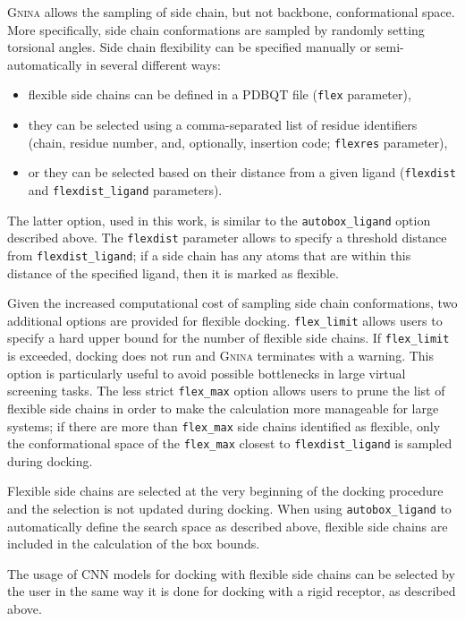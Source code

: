 \documentclass[journal=jcisd8,manuscript=article]{achemso}
\begin{document}
\textsc{Gnina} allows the sampling of side chain, but not backbone, conformational space. More specifically, side chain conformations are sampled by randomly setting torsional angles. Side chain flexibility can be specified manually or semi-automatically in several different ways: 
\begin{itemize}
    \item flexible side chains can be defined in a PDBQT file (\texttt{flex} parameter),
    \item they can be selected using a comma-separated list of residue identifiers (chain, residue number, and, optionally, insertion code; \texttt{flexres} parameter),
    \item or they can be selected based on their distance from a given ligand (\texttt{flexdist} and \texttt{flexdist\_ligand} parameters).
\end{itemize}
The latter option, used in this work, is similar to the \texttt{autobox\_ligand} option described above. The \texttt{flexdist} parameter allows to specify a threshold distance from \texttt{flexdist\_ligand}; if a side chain has any atoms that are within this distance of the specified ligand, then it is marked as flexible. 

Given the increased computational cost of sampling side chain conformations, two additional options are provided for flexible docking. \texttt{flex\_limit} allows users to specify a hard upper bound for the number of flexible side chains. If \texttt{flex\_limit} is exceeded, docking does not run and \textsc{Gnina} terminates with a warning. This option is particularly useful to avoid possible bottlenecks in large virtual screening tasks. The less strict \texttt{flex\_max} option allows users to prune the list of flexible side chains in order to make the calculation more manageable for large systems; if there are more than \texttt{flex\_max} side chains identified as flexible, only the conformational space of the \texttt{flex\_max} closest to \texttt{flexdist\_ligand} is sampled during docking.

Flexible side chains are selected at the very beginning of the docking procedure and the selection is not updated during docking. When using \texttt{autobox\_ligand} to automatically define the search space as described above, flexible side chains are included in the calculation of the box bounds.

The usage of CNN models for docking with flexible side chains can be selected by the user in the same way it is done for docking with a rigid receptor, as described above.
\end{document}
